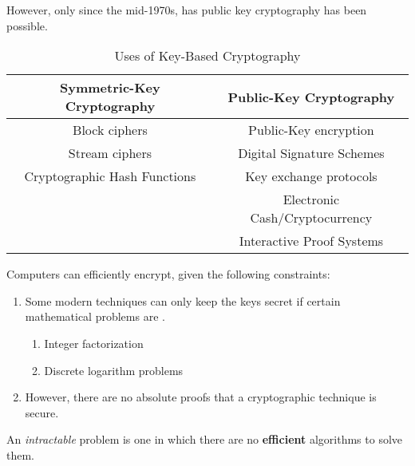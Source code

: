 However, only since the mid-1970s, has public key cryptography has been possible.

\begin{table}[h!]
  \centering
  \begin{tabular}{cc}
    \toprule
    Symmetric-Key Cryptography & Public-Key Cryptography \\
    \midrule
    Block ciphers & Public-Key encryption \\
    Stream ciphers & Digital Signature Schemes \\
    Cryptographic Hash Functions & Key exchange protocols \\
                               & Electronic Cash/Cryptocurrency \\
                               & Interactive Proof Systems \\
    \bottomrule
  \end{tabular}
  \caption{Uses of Key-Based Cryptography}
  \label{tab:Key_Cryptography_Uses}
\end{table}

Computers can efficiently encrypt, given the following constraints:
\begin{enumerate}[noitemsep]
\item Some modern techniques can only keep the keys secret if certain mathematical problems are .
  \begin{enumerate}[noitemsep]
  \item Integer factorization
  \item Discrete logarithm problems
  \end{enumerate}
\item However, there are no absolute proofs that a cryptographic technique is secure.
\end{enumerate}

\begin{definition}[Intractable]\label{def:Intractable}
  An \emph{intractable} problem is one in which there are no \textbf{efficient} algorithms to solve them.
\end{definition}

